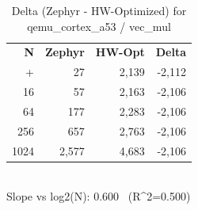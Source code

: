 \begin{table}[tb]
    \centering
    \caption{Delta (Zephyr - HW-Optimized) for qemu_cortex_a53 / vec_mul}
    \label{tab:delta_qemu_cortex_a53_vec_mul}
    \scriptsize
    \begin{tabular}{r r r r}
        \hline
        \textbf{N} & \textbf{Zephyr} & \textbf{HW-Opt} & \textbf{Delta} \\\n+        \hline
        4 & 27 & 2,139 & -2,112\\
        16 & 57 & 2,163 & -2,106\\
        64 & 177 & 2,283 & -2,106\\
        256 & 657 & 2,763 & -2,106\\
        1024 & 2,577 & 4,683 & -2,106\\
        \hline
    \end{tabular}
    \vspace{2mm}\\\n    Slope vs log2(N): 0.600 \ (R^2=0.500)\n\end{table}
